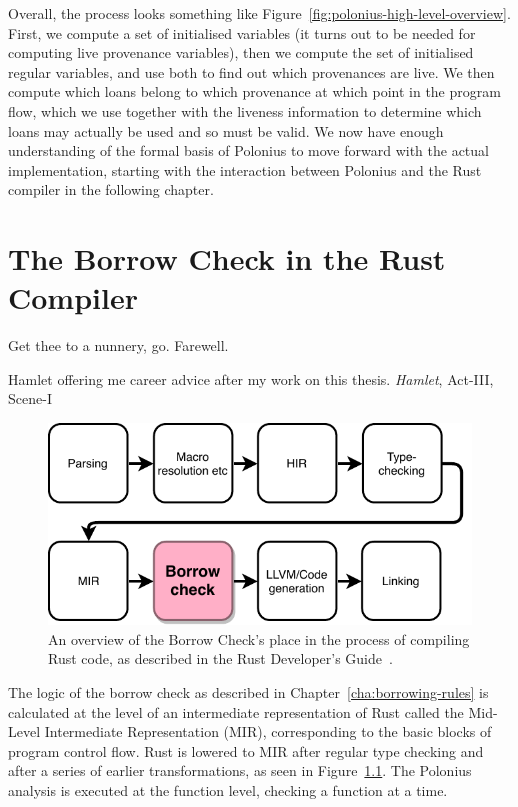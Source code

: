 \documentclass[11pt,a4paper,twoside,openany]{report}
\begin{document}
Overall, the process looks something like
Figure~\ref{fig:polonius-high-level-overview}. First, we compute a set of
initialised variables (it turns out to be needed for computing live provenance
variables), then we compute the set of initialised regular variables, and use
both to find out which provenances are live. We then compute which loans belong
to which provenance at which point in the program flow, which we use together
with the liveness information to determine which loans may actually be used and
so must be valid. We now have enough understanding of the formal basis of
Polonius to move forward with the actual implementation, starting with the
interaction between Polonius and the Rust compiler in the following chapter.


\chapter{The Borrow Check in the Rust Compiler}\label{cha:borrow-check-compiler}
\epigraph{Get thee to a nunnery, go. Farewell.}%
{Hamlet offering me career advice after my work on this thesis. \textit{Hamlet},
  Act-III, Scene-I}

\begin{figure}[h!]
  \includegraphics[width=0.9\linewidth]{Graphs/rustc-overview}
  \caption[The Rust Compilation Process]{An overview of the Borrow Check's place
    in the process of compiling Rust code, as described in the Rust Developer's
    Guide~\cite{rustc_developers_guide_nodate}.}\label{fig:rustc-overview}
\end{figure}

The logic of the borrow check as described in Chapter~\ref{cha:borrowing-rules}
is calculated at the level of an intermediate representation of Rust called the
Mid-Level Intermediate Representation (MIR), corresponding to the basic blocks
of program control flow. Rust is lowered to MIR after regular type checking and
after a series of earlier transformations, as seen in
Figure~\ref{fig:rustc-overview}. The Polonius analysis is executed at the
function level, checking a function at a time.
\end{document}
